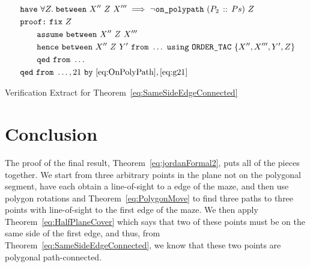 \begin{boxedfigure}
\begin{align*}
  &\code{have}\ \forall Z.\; \between{X''}{Z}{X'''} \implies \neg\code{on\_polypath}\ (\cons{P_2}{Ps})\ Z\\\
  &\code{proof:}\ \code{fix}\ Z\\
  &\qquad \code{assume}\ \between{X''}{Z}{X'''}\\
  &\qquad \code{hence}\ \between{X''}{Z}{Y'}\ \code{from}\ \ldots\ \code{using}\ \code{ORDER\_TAC}\ \{X'',X''',Y',Z\}\\
  &\qquad \code{qed}\ \code{from}\ \ldots\\
  &\code{qed}\ \code{from}\ \ldots,21\ \code{by}\ \eqref{eq:OnPolyPath},\eqref{eq:g21}
\end{align*}
\caption{Verification Extract for Theorem~\ref{eq:SameSideEdgeConnected}}
\label{fig:SameSideEdgeConnectedExtract}
\end{boxedfigure}

\section{Conclusion}
The proof of the final result, Theorem~\ref{eq:jordanFormal2}, puts all of the pieces together. We start from three arbitrary points in the plane not on the polygonal segment, have each obtain a line-of-sight to a edge of the maze, and then use polygon rotations and Theorem~\ref{eq:PolygonMove} to find three paths to three points with line-of-sight to the first edge of the maze. We then apply  Theorem~\ref{eq:HalfPlaneCover} which says that two of these points must be on the same side of the first edge, and thus, from Theorem~\ref{eq:SameSideEdgeConnected}, we know that these two points are polygonal path-connected.

